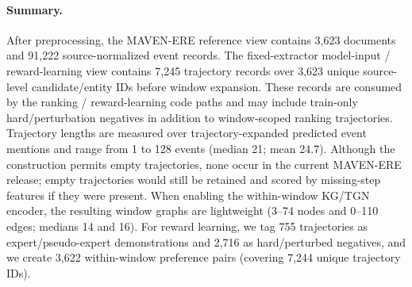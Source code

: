 \documentclass{article}
\begin{document}
\paragraph{Summary.}
After preprocessing, the MAVEN-ERE reference view contains 3{,}623 documents and 91{,}222 source-normalized event records.
The fixed-extractor model-input / reward-learning view contains 7{,}245 trajectory records over 3{,}623 unique source-level candidate/entity IDs before window expansion.
These records are consumed by the ranking / reward-learning code paths and may include train-only hard/perturbation negatives in addition to window-scoped ranking trajectories.
Trajectory lengths are measured over trajectory-expanded predicted event mentions and range from 1 to 128 events (median 21; mean 24.7).
Although the construction permits empty trajectories, none occur in the current MAVEN-ERE release; empty trajectories would still be retained and scored by missing-step features if they were present.
When enabling the within-window KG/TGN encoder, the resulting window graphs are lightweight (3--74 nodes and 0--110 edges; medians 14 and 16).
For reward learning, we tag 755 trajectories as expert/pseudo-expert demonstrations and 2,716 as hard/perturbed negatives, and we create 3,622 within-window preference pairs (covering 7,244 unique trajectory IDs).
\end{document}
